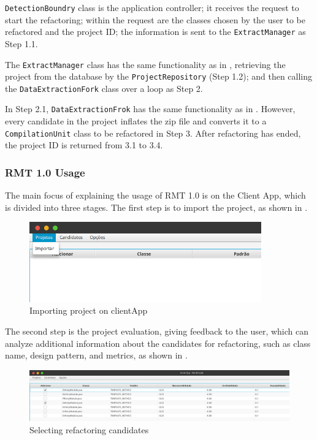 \texttt{DetectionBoundry} class is the application controller; it receives the request to start the refactoring; within the request are the classes chosen by the user to be refactored and the project ID; the information is sent to the \texttt{ExtractManager} as Step 1.1.

The \texttt{ExtractManager} class has the same functionality as in , retrieving the project from the database by the \texttt{ProjectRepository} (Step 1.2); and then calling the \texttt{DataExtractionFork} class over a loop as Step 2.

 In Step 2.1, \texttt{DataExtractionFrok} has the same functionality as in . However, every candidate in the project inflates the zip file and converts it to a \texttt{CompilationUnit} class to be refactored in Step 3. After refactoring has ended, the project ID is returned from 3.1 to 3.4.

\subsubsection{RMT 1.0 Usage}
\label{sub-usage}

The main focus of explaining the usage of RMT 1.0 is on the Client App, which is divided into three stages. The first step is to import the project, as shown in .

\begin{figure}[ht!]
\SetCaptionWidth{\textwidth}
\caption{Importing project on clientApp}
\label{fig-import}
\includegraphics[width =100mm]{Chapter-2/Figures/import.png}
\end{figure}
\FloatBarrier

The second step is the project evaluation, giving feedback to the user, which can analyze additional information about the candidates for refactoring, such as class name, design pattern, and metrics, as shown in .

\begin{figure}[ht!]
\SetCaptionWidth{\textwidth}
\caption{Selecting refactoring candidates}
\label{fig-choose}
\includegraphics[width =\textwidth]{Chapter-2/Figures/choose.png}
\end{figure}
\FloatBarrier

